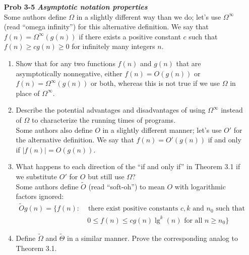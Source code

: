 \documentclass[fontsize=12pt,paper=a4]{book}
\begin{document}
\begin{enumerate}
 \item[\textbf{Prob 3-5}]
       \textbf{\textit{Asymptotic notation properties}}\\
       Some authors define $\Omega$ in a slightly different way than we do; let’s use $\Omega^\infty$ (read “omega infinity”) for this alternative definition. We say that $f(n) = \Omega^\infty (g(n))$ if there exists a positive constant $c$ such that $f(n) \geq cg(n) \geq 0$ for infinitely many integers $n$.
       \begin{enumerate}
        \item Show that for any two functions $f(n)$ and $g(n)$ that are asymptotically nonnegative, either $f(n) = O(g(n))$ or $f(n) = \Omega^\infty(g(n))$ or both, whereas this is not true if we use $\Omega$ in place of $\Omega^\infty$.
        \item Describe the potential advantages and disadvantages of using $\Omega^\infty$ instead of $\Omega$ to characterize the running times of programs.\\
              Some authors also define $O$ in a slightly different manner; let’s use $O'$ for the alternative definition. We say that $f(n) = O'(g(n))$ if and only if $\lvert f(n) \rvert = O(g(n))$.
        \item What happens to each direction of the “if and only if” in Theorem 3.1 if we substitute $O'$ for $O$ but still use $\Omega$?\\
              Some authors define $\tilde{O}$ (read “soft-oh”) to mean $O$ with logarithmic factors ignored:
              \begin{equation*}
               \begin{split}
                \tilde{O}g(n) = \{f(n) : & \text{ there exist positive constants  } c, k \text{ and } n_0 \text{ such that }\\
                & \ 0\leq f(n) \leq cg(n)\lg^k(n) \text{ for all } n \geq n_0 \}
               \end{split}
              \end{equation*}
        \item Define $\tilde{\Omega}$ and $\tilde{\Theta}$ in a similar manner. Prove the corresponding analog to Theorem 3.1.
       \end{enumerate}
       

\end{enumerate}
\end{document}
